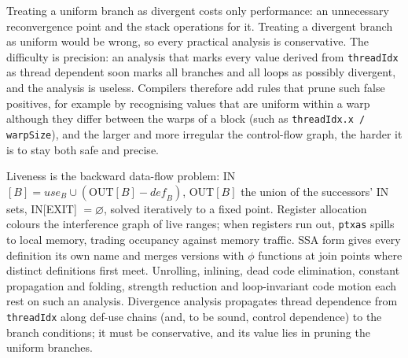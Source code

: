 \documentclass[../main.tex]{subfiles}
\begin{document}
Treating a uniform branch as divergent costs only performance: an
unnecessary reconvergence point and the stack operations for it.%
Treating a divergent branch as uniform would be wrong, so every
practical analysis is conservative.  The difficulty is precision: an
analysis that marks every value derived from \texttt{threadIdx} as
thread dependent soon marks all branches and all loops as possibly
divergent, and the analysis is useless.  Compilers therefore add rules that
prune such false positives, for example by recognising values that are
uniform within a warp although they differ between the warps of a
block (such as \texttt{threadIdx.x / warpSize}), and the larger
and more irregular the control-flow graph, the harder it is to stay
both safe and precise.

\begin{keypoint}
  Liveness is the backward data-flow problem: IN$[B] = \mathit{use}_B
  \cup (\mathrm{OUT}[B] - \mathit{def}_B)$, OUT$[B]$ the union of the
  successors' IN sets, IN[EXIT] $= \varnothing$, solved iteratively to a
  fixed point.  Register allocation colours the interference graph of
  live ranges; when registers run out, \texttt{ptxas} spills to local
  memory, trading occupancy against memory traffic.  SSA form gives
  every definition its own name and merges versions with $\phi$
  functions at join points where distinct definitions first meet.
  Unrolling, inlining, dead code elimination, constant propagation and
  folding, strength reduction and loop-invariant code motion each rest
  on such an analysis.  Divergence analysis propagates thread
  dependence from \texttt{threadIdx} along def-use chains (and, to be
  sound, control dependence) to the branch conditions; it must be
  conservative, and its value lies in pruning the uniform branches.
\end{keypoint}
\end{document}

